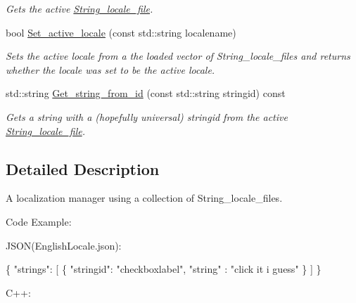 \begin{DoxyCompactItemize}
\begin{DoxyCompactList}\small\item\em Gets the active \hyperlink{classjetfuel_1_1locale_1_1String__locale__file}{String\+\_\+locale\+\_\+file}. \end{DoxyCompactList}\item 
bool \hyperlink{classjetfuel_1_1locale_1_1String__locale__manager_a2bca626efc214510e533a8c4ece7cafb}{Set\+\_\+active\+\_\+locale} (const std\+::string localename)
\begin{DoxyCompactList}\small\item\em Sets the active locale from a the loaded vector of String\+\_\+locale\+\_\+files and returns whether the locale was set to be the active locale. \end{DoxyCompactList}\item 
std\+::string \hyperlink{classjetfuel_1_1locale_1_1String__locale__manager_a215fa1aaf302e45b1ab375f764a8d101}{Get\+\_\+string\+\_\+from\+\_\+id} (const std\+::string stringid) const
\begin{DoxyCompactList}\small\item\em Gets a string with a (hopefully universal) stringid from the active \hyperlink{classjetfuel_1_1locale_1_1String__locale__file}{String\+\_\+locale\+\_\+file}. \end{DoxyCompactList}\end{DoxyCompactItemize}


\subsection{Detailed Description}
A localization manager using a collection of String\+\_\+locale\+\_\+files.

Code Example\+:

J\+S\+ON(English\+Locale.\+json)\+: 
\begin{DoxyCode}
\{
    \textcolor{stringliteral}{"strings"}: [
        \{
            \textcolor{stringliteral}{"stringid"}: \textcolor{stringliteral}{"checkboxlabel"},
            \textcolor{stringliteral}{"string"} : \textcolor{stringliteral}{"click it i guess"}
        \}
    ]
\}
\end{DoxyCode}


C++\+:



